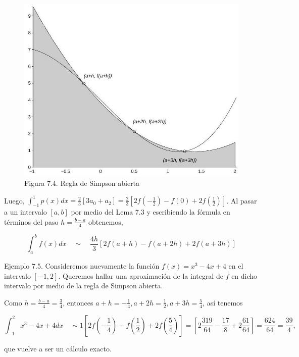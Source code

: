 \documentclass[10pt]{book}
\begin{document}
\begin{figure}[h]
\begin{center}
  \includegraphics[width=\textwidth]{2025_09_05_3888c9ac96bd653d96b4g-144}
\captionsetup{labelformat=empty}
\caption{Figura 7.4. Regla de Simpson abierta}
\end{center}
\end{figure}

Luego, $\int_{-1}^{1} p(x) d x=\frac{2}{3}\left[3 a_{0}+a_{2}\right]=\frac{2}{3}\left[2 f\left(-\frac{1}{2}\right)-f(0)+2 f\left(\frac{1}{2}\right)\right]$. Al pasar a un intervalo $[a, b]$ por medio del Lema 7.3 y escribiendo la fórmula en términos del paso $h=\frac{b-a}{4}$ obtenemos,

$$
\int_{a}^{b} f(x) d x \quad \sim \quad \frac{4 h}{3}[2 f(a+h)-f(a+2 h)+2 f(a+3 h)]
$$

Ejemplo 7.5. Consideremos nuevamente la función $f(x)=x^{3}-4 x+4$ en el intervalo $[-1,2]$. Queremos hallar una aproximación de la integral de $f$ en dicho intervalo por medio de la regla de Simpson abierta.

Como $h=\frac{b-a}{4}=\frac{3}{4}$, entonces $a+h=-\frac{1}{4}, a+2 h=\frac{1}{2}, a+3 h=\frac{5}{4}$, así tenemos

$$
\int_{-1}^{2} x^{3}-4 x+4 d x \quad \sim 1\left[2 f\left(-\frac{1}{4}\right)-f\left(\frac{1}{2}\right)+2 f\left(\frac{5}{4}\right)\right]=\left[2 \frac{319}{64}-\frac{17}{8}+2 \frac{61}{64}\right]=\frac{624}{64}=\frac{39}{4},
$$

que vuelve a ser un cálculo exacto.
\end{document}
